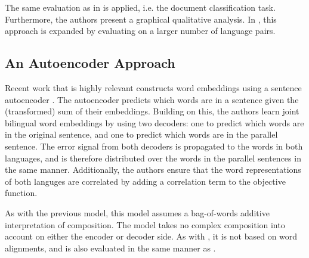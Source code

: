 The same evaluation as in \cite{klementiev2012inducing} is applied, i.e. the document classification task. Furthermore, the authors present a graphical qualitative analysis. 
In \cite{Hermann2014}, this approach is expanded by evaluating on a larger number of language pairs.

\subsection{An Autoencoder Approach}

Recent work that is highly relevant constructs word embeddings using a sentence autoencoder \cite{SarathChandar2014autoencoder}.
The autoencoder predicts which words are in a sentence given the (transformed) sum of their embeddings.
Building on this, the authors learn joint bilingual word embeddings by using two decoders: one to predict which words are in the original sentence, and one to predict which words are in the parallel sentence.
The error signal from both decoders is propagated to the words in both languages, and is therefore distributed over the words in the parallel sentences in the same manner.
Additionally, the authors ensure that the word representations of both languges are correlated by adding a correlation term to the objective function.

As with the previous model, this model assumes a bag-of-words additive interpretation of composition.
The model takes no complex composition into account on either the encoder or decoder side.
As with \cite{hermann2013multilingual}, it is not based on word alignments, and is also evaluated in the same manner as \cite{klementiev2012inducing}.




